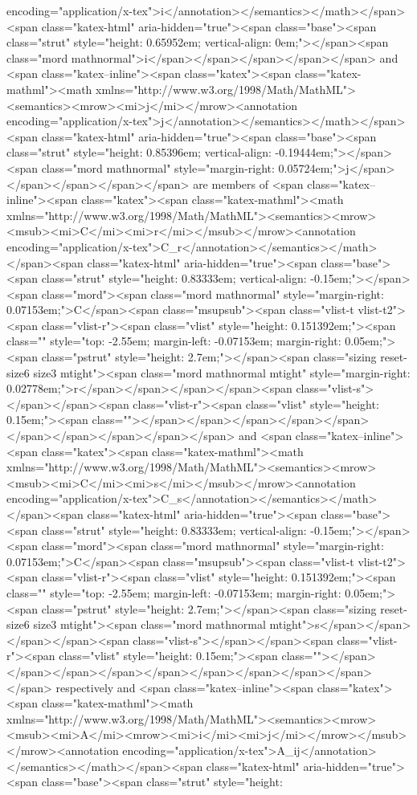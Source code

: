 encoding="application/x-tex">i</annotation></semantics></math></span><span class="katex-html" aria-hidden="true"><span class="base"><span class="strut" style="height: 0.65952em; vertical-align: 0em;"></span><span class="mord mathnormal">i</span></span></span></span></span> and <span class="katex--inline"><span class="katex"><span class="katex-mathml"><math xmlns="http://www.w3.org/1998/Math/MathML"><semantics><mrow><mi>j</mi></mrow><annotation encoding="application/x-tex">j</annotation></semantics></math></span><span class="katex-html" aria-hidden="true"><span class="base"><span class="strut" style="height: 0.85396em; vertical-align: -0.19444em;"></span><span class="mord mathnormal" style="margin-right: 0.05724em;">j</span></span></span></span></span> are members of <span class="katex--inline"><span class="katex"><span class="katex-mathml"><math xmlns="http://www.w3.org/1998/Math/MathML"><semantics><mrow><msub><mi>C</mi><mi>r</mi></msub></mrow><annotation encoding="application/x-tex">C_r</annotation></semantics></math></span><span class="katex-html" aria-hidden="true"><span class="base"><span class="strut" style="height: 0.83333em; vertical-align: -0.15em;"></span><span class="mord"><span class="mord mathnormal" style="margin-right: 0.07153em;">C</span><span class="msupsub"><span class="vlist-t vlist-t2"><span class="vlist-r"><span class="vlist" style="height: 0.151392em;"><span class="" style="top: -2.55em; margin-left: -0.07153em; margin-right: 0.05em;"><span class="pstrut" style="height: 2.7em;"></span><span class="sizing reset-size6 size3 mtight"><span class="mord mathnormal mtight" style="margin-right: 0.02778em;">r</span></span></span></span><span class="vlist-s">​</span></span><span class="vlist-r"><span class="vlist" style="height: 0.15em;"><span class=""></span></span></span></span></span></span></span></span></span></span> and <span class="katex--inline"><span class="katex"><span class="katex-mathml"><math xmlns="http://www.w3.org/1998/Math/MathML"><semantics><mrow><msub><mi>C</mi><mi>s</mi></msub></mrow><annotation encoding="application/x-tex">C_s</annotation></semantics></math></span><span class="katex-html" aria-hidden="true"><span class="base"><span class="strut" style="height: 0.83333em; vertical-align: -0.15em;"></span><span class="mord"><span class="mord mathnormal" style="margin-right: 0.07153em;">C</span><span class="msupsub"><span class="vlist-t vlist-t2"><span class="vlist-r"><span class="vlist" style="height: 0.151392em;"><span class="" style="top: -2.55em; margin-left: -0.07153em; margin-right: 0.05em;"><span class="pstrut" style="height: 2.7em;"></span><span class="sizing reset-size6 size3 mtight"><span class="mord mathnormal mtight">s</span></span></span></span><span class="vlist-s">​</span></span><span class="vlist-r"><span class="vlist" style="height: 0.15em;"><span class=""></span></span></span></span></span></span></span></span></span></span> respectively and <span class="katex--inline"><span class="katex"><span class="katex-mathml"><math xmlns="http://www.w3.org/1998/Math/MathML"><semantics><mrow><msub><mi>A</mi><mrow><mi>i</mi><mi>j</mi></mrow></msub></mrow><annotation encoding="application/x-tex">A_{ij}</annotation></semantics></math></span><span class="katex-html" aria-hidden="true"><span class="base"><span class="strut" style="height: 